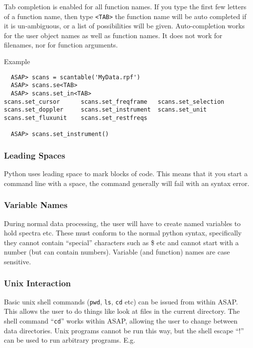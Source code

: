 \documentclass[11pt]{article}
\newcommand{\cmd}[1]{{\tt #1}}
\begin{document}
Tab completion is enabled for all
function names. If you type the first few letters of a function name,
then type {\tt <TAB>} the function name will be auto completed if it
is un-ambiguous, or a list of possibilities will be
given. Auto-completion works for the user object names as well as
function names. It does not work for filenames, nor for function
arguments.

Example
\begin{verbatim}
  ASAP> scans = scantable('MyData.rpf')
  ASAP> scans.se<TAB>
  ASAP> scans.set_in<TAB>
scans.set_cursor      scans.set_freqframe   scans.set_selection
scans.set_doppler     scans.set_instrument  scans.set_unit
scans.set_fluxunit    scans.set_restfreqs

  ASAP> scans.set_instrument()
\end{verbatim}

\subsubsection{Leading Spaces}

Python uses leading space to mark blocks
of code. This means that it you start a command line with a space, the
command generally will fail with an syntax error.

\subsubsection{Variable Names}

During normal data processing, the user
will have to create named variables to hold spectra etc. These must
conform to the normal python syntax, specifically they cannot contain
``special'' characters such as \@ \$ etc and cannot start with a
number (but can contain numbers).  Variable (and function) names are
case sensitive.

\subsubsection{Unix Interaction}

Basic unix shell commands (\cmd{pwd},
\cmd{ls}, \cmd{cd} etc) can be issued from within ASAP. This allows
the user to do things like look at files in the current directory. The
shell command ``\cmd{cd}'' works within ASAP, allowing the user to
change between data directories. Unix programs cannot be run this way,
but the shell escape ``$!$'' can be used to run arbitrary
programs. E.g.
\end{document}
